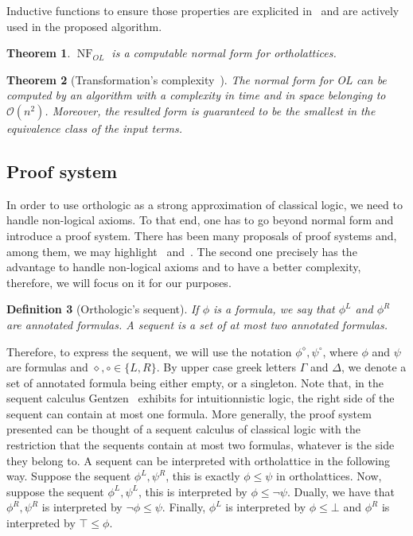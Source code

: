 \documentclass[a4paper, 11pt]{article}
\newtheorem{theorem}{Theorem}
\newtheorem{definition}[theorem]{Definition}
\DeclareMathOperator{\nf}{NF}
\begin{document}
    Inductive functions to ensure those properties are explicited in~\cite{10.1007/978-3-031-37709-9_19}
    and are actively used in the proposed algorithm.
    \begin{theorem}
	    $\nf_{OL}$ is a computable normal form for ortholattices.
    \end{theorem}
    \begin{theorem}[Transformation's complexity~\cite{10.1007/978-3-031-37709-9_19}]
	    The normal form for OL can be computed by an algorithm with a complexity in time and in space
	    belonging to $\mathcal{O}(n^2)$. Moreover, the resulted form
	    is guaranteed to be the smallest in the equivalence class of the input terms.
    \end{theorem}
    \subsection{Proof system}
    In order to use orthologic as a strong approximation of classical logic, we need to handle
    non-logical axioms. To that end, one has to go beyond normal form and introduce a proof system. 
    There has been 
    many proposals of proof systems and, among them, we may highlight~\cite{Laurent17a} 
    and~\cite{10.1145/3632881}. The second one precisely has the advantage to handle non-logical axioms 
    and to have a better complexity, therefore, we will focus on it for our purposes. 
    \begin{definition}[Orthologic's sequent]
	    If $\phi$ is a formula, we say that $\phi^L$ and $\phi^R$ are annotated formulas. A 
	    sequent is a set of at most two annotated formulas.
    \end{definition}
    Therefore, to express the sequent, we will use the notation $\phi^\diamond,\psi^\circ$, where 
    $\phi$ and $\psi$ are formulas and $\diamond,\circ\in\{L,R\}$. By upper case greek letters $\Gamma$ 
    and $\Delta$, we denote a set of annotated formula being either empty, or a singleton. Note that,
    in the sequent calculus
    Gentzen~\cite{Gentzen1935UntersuchungenD} exhibits for intuitionnistic logic, the right side of the 
    sequent can contain at most one formula. More generally, the proof system presented can be thought
    of a sequent calculus of classical logic with the restriction that the sequents contain at most
    two formulas, whatever is the side they belong to.
    A sequent can be interpreted with ortholattice in the following way. Suppose the sequent 
    $\phi^L,\psi^R$, this is exactly $\phi\leq\psi$ in ortholattices. Now, suppose the sequent 
    $\phi^L,\psi^L$, this is interpreted by $\phi\leq\neg\psi$. Dually, we have that $\phi^R,\psi^R$
    is interpreted by $\neg\phi\leq\psi$. Finally, $\phi^L$ is interpreted by $\phi\leq\bot$ and
    $\phi^R$ is interpreted by $\top\leq\phi$.
\end{document}
